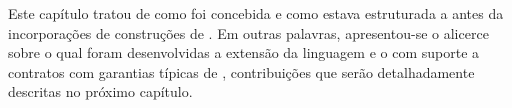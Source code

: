 Este capítulo tratou de como foi concebida e como estava estruturada a
\neoidl{} antes da incorporações de construções de \designbycontract{}. Em
outras palavras, apresentou-se o alicerce sobre o qual foram
desenvolvidas a extensão da linguagem e o \framework{} \neoidl{} com suporte a
contratos com garantias típicas de \designbycontract{}, contribuições que serão
detalhadamente descritas no próximo capítulo.
